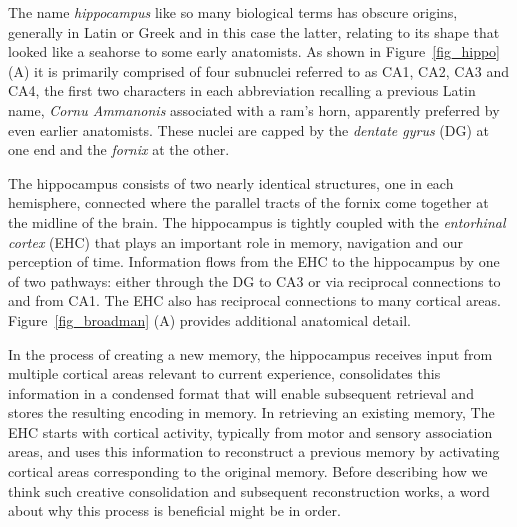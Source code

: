 \documentclass[letterpaper,11pt]{article}
\def\footnote#1{{}}
\def\colorred#1{{\color{red}#1}}
\def\urlh#1{{}}
\begin{document}

The name {\it{hippocampus}} like so many biological terms has obscure origins, generally in Latin or Greek and in this case the latter, relating to its shape that looked like a seahorse to some early anatomists. As shown in Figure~{\urlh{#fig_Hippocampus_Anatomy_and_Physiology}{\ref{fig_hippo}}} ({\colorred{A}}) it is primarily comprised of four subnuclei referred to as CA1, CA2, CA3 and CA4, the first two characters in each abbreviation recalling a previous Latin name, {\it{Cornu Ammanonis}} associated with a ram's horn, apparently preferred by even earlier anatomists. These nuclei are capped by the {\it{dentate gyrus}} (DG) at one end and the {\it{fornix}} at the other\footnote{%
%
  The hippocampus plays an important role in the transfer of information from short-term memory to long-term memory during encoding and retrieval stages. These stages need not occur successively, but are broadly divided in the neuronal mechanisms they require or even in the hippocampal areas they activate. According to Michael Gazzaniga, "encoding is the processing of incoming information that creates memory traces to be stored." There are two steps to encoding: acquisition and consolidation. During acquisition, stimuli are committed to short term memory. Consolidation is where the hippocampus along with other cortical structures stabilize an object within long term memory. ({\urlh{https://en.wikipedia.org/wiki/Hippocampal_memory_encoding_and_retrieval}{SOURCE}})}. 

The hippocampus consists of two nearly identical structures, one in each hemisphere, connected where the parallel tracts of the fornix come together at the midline of the brain. The hippocampus is tightly coupled with the {\it{entorhinal cortex}} (EHC) that plays an important role in memory, navigation and our perception of time. Information flows from the EHC to the hippocampus by one of two pathways: either through the DG to CA3 or via reciprocal connections to and from CA1. The EHC also has reciprocal connections to many cortical areas. Figure~{\urlh{#fig_Brodmann_Basal_Ganglia_Hippocampus}{\ref{fig_broadman}}} ({\colorred{A}}) provides additional anatomical detail. 

In the process of creating a new memory, the hippocampus receives input from multiple cortical areas relevant to current experience, consolidates this information in a condensed format that will enable subsequent retrieval and stores the resulting encoding in memory. In retrieving an existing memory, The EHC starts with cortical activity, typically from motor and sensory association areas, and uses this information to reconstruct a previous memory by activating cortical areas corresponding to the original memory. Before describing how we think such creative consolidation and subsequent reconstruction works, a word about why this process is beneficial might be in order.
\end{document}
